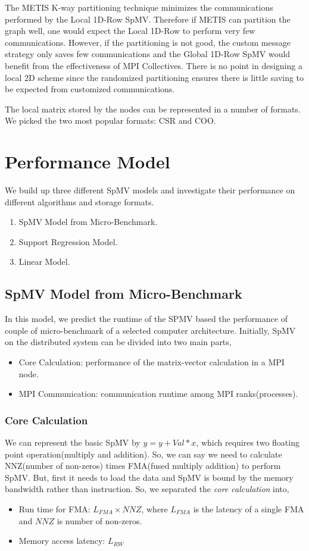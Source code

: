 \documentclass[conference, 10ppt]{IEEEtran}
\begin{document}
The METIS K-way partitioning technique minimizes the communications
performed by the Local 1D-Row SpMV. Therefore if METIS can partition
the graph well, one would expect the Local 1D-Row to perform very few
communications. However, if the partitioning is not good, the custom
message strategy only saves few communications and the Global 1D-Row
SpMV would benefit from the effectiveness of MPI Collectives. There is
no point in designing a local 2D scheme since the randomized
partitioning ensures there is little saving to be expected from
customized communications.

The local matrix stored by the nodes can be represented in a number of
formats. We picked the two most popular formats: CSR and COO.

\section{Performance Model}
We build up three different SpMV models and investigate their performance on different algorithms and
storage formats.
\begin{enumerate}
\item SpMV Model from Micro-Benchmark.
\item Support Regression Model.
\item Linear Model.
\end{enumerate} 

\subsection{SpMV Model from Micro-Benchmark}
In this model, we predict the runtime of the SPMV based the performance of couple of micro-benchmark of 
a selected computer architecture. Initially, SpMV on the distributed system can be divided into two main parts,
\begin{itemize}
\item Core Calculation: performance of the matrix-vector calculation in a MPI node.
\item MPI Communication: communication runtime among MPI ranks(processes). 
\end{itemize}
\subsubsection{Core Calculation}
We can represent the basic SpMV by $y=y+Val*x$, which requires two floating point operation(multiply and addition). 
So, we can say we need to calculate NNZ(number of non-zeros) times FMA(fused multiply addition) to perform SpMV.
But, first it needs to load the data and SpMV is bound by the memory bandwidth rather than instruction. So, we 
separated the \textit{core calculation} into,
\begin{itemize}
\item Run time for FMA: $L_{FMA}\times NNZ$, where $L_{FMA}$ is the latency of a single FMA and $NNZ$ is number of non-zeros.
\item Memory access latency: $L_{RW}$
\end{itemize} 
\end{document}
